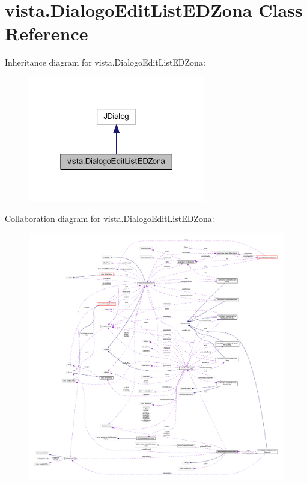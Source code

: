 \hypertarget{classvista_1_1_dialogo_edit_list_e_d_zona}{}\section{vista.\+Dialogo\+Edit\+List\+E\+D\+Zona Class Reference}
\label{classvista_1_1_dialogo_edit_list_e_d_zona}


Inheritance diagram for vista.\+Dialogo\+Edit\+List\+E\+D\+Zona\+:
\nopagebreak
\begin{figure}[H]
\begin{center}
\leavevmode
\includegraphics[width=219pt]{classvista_1_1_dialogo_edit_list_e_d_zona__inherit__graph}
\end{center}
\end{figure}


Collaboration diagram for vista.\+Dialogo\+Edit\+List\+E\+D\+Zona\+:
\nopagebreak
\begin{figure}[H]
\begin{center}
\leavevmode
\includegraphics[width=350pt]{classvista_1_1_dialogo_edit_list_e_d_zona__coll__graph}
\end{center}
\end{figure}
